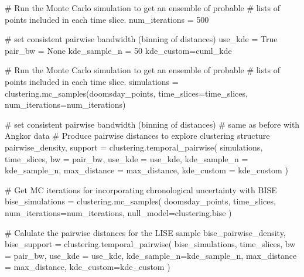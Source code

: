 \documentclass[
  11pt,
  letterpaper,
  DIV=11,
  numbers=noendperiod]{scrartcl}
\newenvironment{Shaded}{\begin{snugshade}}{\end{snugshade}}
\newcommand{\CommentTok}[1]{\textcolor[rgb]{0.37,0.37,0.37}{#1}}
\newcommand{\DecValTok}[1]{\textcolor[rgb]{0.68,0.00,0.00}{#1}}
\newcommand{\NormalTok}[1]{\textcolor[rgb]{0.00,0.23,0.31}{#1}}
\newcommand{\OperatorTok}[1]{\textcolor[rgb]{0.37,0.37,0.37}{#1}}
\newcommand{\VariableTok}[1]{\textcolor[rgb]{0.07,0.07,0.07}{#1}}
\begin{document}
\begin{Shaded}
\begin{Highlighting}[]
    \CommentTok{\# Run the Monte Carlo simulation to get an ensemble of probable }
    \CommentTok{\# lists of points included in each time slice.}
\NormalTok{    num\_iterations }\OperatorTok{=} \DecValTok{500}


    \CommentTok{\# set consistent pairwise bandwidth (binning of distances)}
\NormalTok{    use\_kde }\OperatorTok{=} \VariableTok{True}
\NormalTok{    pair\_bw }\OperatorTok{=} \VariableTok{None}
\NormalTok{    kde\_sample\_n }\OperatorTok{=} \DecValTok{50}
\NormalTok{    kde\_custom}\OperatorTok{=}\NormalTok{cuml\_kde}

    \CommentTok{\# Run the Monte Carlo simulation to get an ensemble of probable }
    \CommentTok{\# lists of points included in each time slice.}
\NormalTok{    simulations }\OperatorTok{=}\NormalTok{ clustering.mc\_samples(doomsday\_points, }
\NormalTok{                                        time\_slices}\OperatorTok{=}\NormalTok{time\_slices,  }
\NormalTok{                                        num\_iterations}\OperatorTok{=}\NormalTok{num\_iterations)}

    \CommentTok{\# set consistent pairwise bandwidth (binning of distances)}
    \CommentTok{\# same as before with Angkor data}
    \CommentTok{\# Produce pairwise distances to explore clustering structure}
\NormalTok{    pairwise\_density, support }\OperatorTok{=}\NormalTok{ clustering.temporal\_pairwise(}
\NormalTok{        simulations, }
\NormalTok{        time\_slices, }
\NormalTok{        bw }\OperatorTok{=}\NormalTok{ pair\_bw, }
\NormalTok{        use\_kde }\OperatorTok{=}\NormalTok{ use\_kde, }
\NormalTok{        kde\_sample\_n }\OperatorTok{=}\NormalTok{ kde\_sample\_n,}
\NormalTok{        max\_distance }\OperatorTok{=}\NormalTok{ max\_distance,}
\NormalTok{        kde\_custom }\OperatorTok{=}\NormalTok{ kde\_custom}
\NormalTok{    )}
    
    \CommentTok{\# Get MC iterations for incorporating chronological uncertainty with BISE}
\NormalTok{    bise\_simulations }\OperatorTok{=}\NormalTok{ clustering.mc\_samples(}
\NormalTok{        doomsday\_points, }
\NormalTok{        time\_slices, }
\NormalTok{        num\_iterations}\OperatorTok{=}\NormalTok{num\_iterations,}
\NormalTok{        null\_model}\OperatorTok{=}\NormalTok{clustering.bise}
\NormalTok{    )}

    \CommentTok{\# Calulate the pairwise distances for the LISE sample}
\NormalTok{    bise\_pairwise\_density, bise\_support }\OperatorTok{=}\NormalTok{ clustering.temporal\_pairwise(}
\NormalTok{        bise\_simulations, }
\NormalTok{        time\_slices, }
\NormalTok{        bw }\OperatorTok{=}\NormalTok{ pair\_bw, }
\NormalTok{        use\_kde }\OperatorTok{=}\NormalTok{ use\_kde,}
\NormalTok{        kde\_sample\_n}\OperatorTok{=}\NormalTok{kde\_sample\_n, }
\NormalTok{        max\_distance }\OperatorTok{=}\NormalTok{ max\_distance,}
\NormalTok{        kde\_custom}\OperatorTok{=}\NormalTok{kde\_custom}
\NormalTok{    )}


\end{Highlighting}
\end{Shaded}
\end{document}
